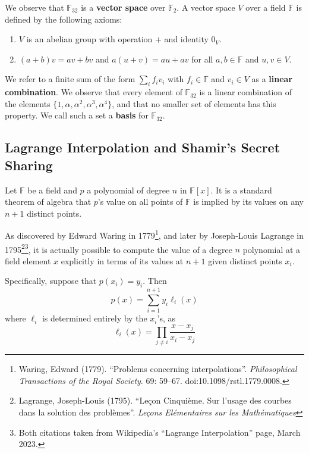 \documentclass[letterpaper]{article}
\newcommand{\ftwo}{\mathbb{F}_2}
\newcommand{\fttwo}{\mathbb{F}_{32}}
\begin{document}
We observe that $\fttwo$ is a \textbf{vector space} over $\ftwo$. A vector
space $V$ over a field $\mathbb{F}$ is defined by the following axioms:

\begin{enumerate}
\item $V$ is an abelian group with operation $+$ and identity $0_V$.
\item $(a + b)v = av + bv$ and $a(u + v) = au + av$ for all $a,b\in \mathbb{F}$ and
$u,v\in V$.
\end{enumerate}

We refer to a finite sum of the form $\sum_i f_{i}v_i$ with $f_i\in \mathbb{F}$ and
$v_i\in V$ as a \textbf{linear combination}. We observe that every element
of $\fttwo$ is a linear combination of the elements $\{1,\alpha,\alpha^2,
\alpha^3,\alpha^4\}$, and that no smaller set of elements has this property.
We call such a set a \textbf{basis} for $\fttwo$.

\subsection{Lagrange Interpolation and Shamir's Secret Sharing\label{sec:sss}}

Let $\mathbb{F}$ be a field and $p$ a polynomial of degree $n$ in $\mathbb{F}[x]$. It is a
standard theorem of algebra that $p$'s value on all points of $\mathbb{F}$ is
implied by its values on any $n+1$ distinct points.

As discovered by Edward Waring in
1779\footnote{Waring, Edward (1779). ``Problems concerning interpolations''.
\emph{Philosophical Transactions of the Royal Society}. 69: 59–67.
doi:10.1098/rstl.1779.0008.},
and later by Joseph-Louis Lagrange in 1795\footnote{Lagrange, Joseph-Louis (1795).
``Leçon Cinquième. Sur l'usage des courbes dans la solution des problèmes''.
\emph{Leçons Elémentaires sur les Mathématiques}}\footnote{Both citations taken
from Wikipedia's ``Lagrange Interpolation'' page, March 2023.},
it is actually possible to compute
the value of a degree $n$ polynomial at a field element $x$ explicitly in terms of
its values at $n + 1$ given distinct points $x_i$.

Specifically, suppose that $p(x_i) = y_i$. Then
\begin{equation}
 p(x) = \sum_{i=1}^{n+1} y_i \ell_i(x) \label{eq:linterp}
\end{equation}
where $\ell_i$ is determined entirely by the $x_i$'s, as
\[ \ell_i(x) = \prod_{j\neq i} \frac{x - x_j}{x_i - x_j} \]
\end{document}

